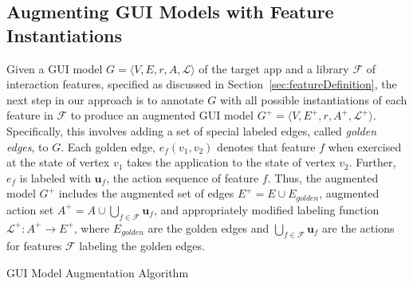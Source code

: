 \subsection{Augmenting GUI Models with Feature Instantiations}
\label{sec:modelAugmentation}

Given a GUI model $G = \langle V, E, r, A, \mathcal{L} \rangle$ of the target app and a library $\mathcal{F}$ of interaction features, specified as discussed in Section~\ref{sec:featureDefinition}, the next step in our approach is to annotate $G$ with all possible instantiations of each feature in $\mathcal{F}$ to produce an augmented GUI model $G^+ = \langle V, E^+, r, A^+, \mathcal{L}^+ \rangle$. Specifically, this involves adding a set of special labeled edges, called \textit{golden edges}, to $G$. Each golden edge, $e_f(v_1, v_2)$ denotes that feature $f$ when exercised at the state of vertex $v_1$ takes the application to the state of vertex $v_2$. Further, $e_f$ is labeled with $\mathbf{u}_f$, the action sequence of feature $f$. Thus, the augmented model $G^+$ includes the augmented set of edges $E^+ = E \cup E_{golden}$,  augmented action set $A^+ = A \cup \bigcup_{f \in \mathcal{F}} \mathbf{u}_f$, and appropriately modified labeling function $\mathcal{L}^+: A^+ \rightarrow E^+$, where $E_{golden}$ are the golden edges and $\bigcup_{f \in \mathcal{F}} \mathbf{u}_f$ are the actions for features $\mathcal{F}$ labeling the golden edges.

\begin{algorithm}[t]
\begin{footnotesize}
  \DontPrintSemicolon
  \SetAlFnt{\scriptsize\scriptfont}
  \caption{GUI Model Augmentation Algorithm}\label{alg:augmentGUImodel}
  \BlankLine
\end{footnotesize}  
\end{algorithm}

